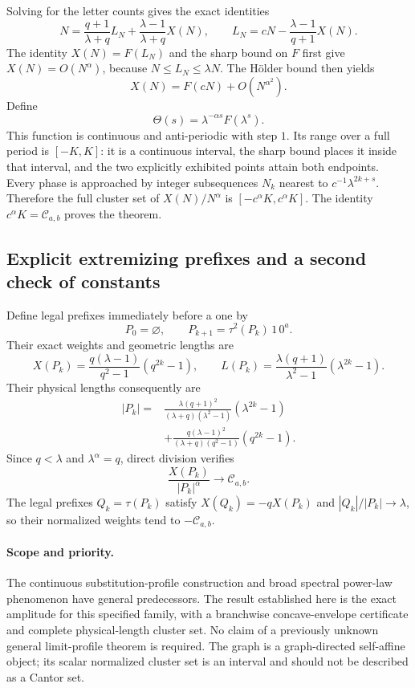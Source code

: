 \documentclass[11pt]{article}
\numberwithin{equation}{section}
\theoremstyle{definition}
\theoremstyle{remark}
\begin{document}
Solving for the letter counts gives the exact identities
\[
 N=\frac{q+1}{\lambda+q}L_N
    +\frac{\lambda-1}{\lambda+q}X(N),
 \qquad
 L_N=cN-\frac{\lambda-1}{q+1}X(N).
\]
The identity $X(N)=F(L_N)$ and the sharp bound on $F$ first
give $X(N)=O(N^\alpha)$, because $N\leq L_N\leq\lambda N$.
The H\"older bound then yields
\[
 X(N)=F(cN)+O(N^{\alpha^2}).
\]
Define
\[
 \Theta(s)=\lambda^{-\alpha s}F(\lambda^s).
\]
This function is continuous and anti-periodic with step $1$. Its range
over a full period is $[-K,K]$: it is a continuous interval, the sharp
bound places it inside that interval, and the two explicitly exhibited
points attain both endpoints. Every phase is approached by integer
subsequences $N_k$ nearest to $c^{-1}\lambda^{2k+s}$. Therefore the full
cluster set of $X(N)/N^\alpha$ is $[-c^\alpha K,c^\alpha K]$.
The identity $c^\alpha K=\mathcal C_{a,b}$ proves the theorem.

\subsection{Explicit extremizing prefixes and a second check of constants}

Define legal prefixes immediately before a one by
\[
 P_0=\varnothing,\qquad P_{k+1}=\tau^2(P_k)\,1\,0^a.
\]
Their exact weights and geometric lengths are
\[
 X(P_k)=\frac{q(\lambda-1)}{q^2-1}(q^{2k}-1),\qquad
 L(P_k)=\frac{\lambda(q+1)}{\lambda^2-1}(\lambda^{2k}-1).
\]
Their physical lengths consequently are
\begin{align*}
 |P_k|={}&
 \frac{\lambda(q+1)^2}{(\lambda+q)(\lambda^2-1)}
       (\lambda^{2k}-1)\\
 &+\frac{q(\lambda-1)^2}{(\lambda+q)(q^2-1)}
       (q^{2k}-1).
\end{align*}
Since $q<\lambda$ and $\lambda^\alpha=q$, direct division verifies
\[
 \frac{X(P_k)}{|P_k|^\alpha}\longrightarrow\mathcal C_{a,b}.
\]
The legal prefixes $Q_k=\tau(P_k)$ satisfy
$X(Q_k)=-qX(P_k)$ and $|Q_k|/|P_k|\to\lambda$, so their normalized
weights tend to $-\mathcal C_{a,b}$.

\paragraph{Scope and priority.}
The continuous substitution-profile construction and broad spectral
power-law phenomenon have general predecessors. The result established
here is the exact amplitude for this specified family, with a branchwise
concave-envelope certificate and complete physical-length cluster set.
No claim of a previously unknown general limit-profile theorem is required.
The graph is a graph-directed self-affine object; its scalar normalized
cluster set is an interval and should not be described as a Cantor set.
\end{document}
